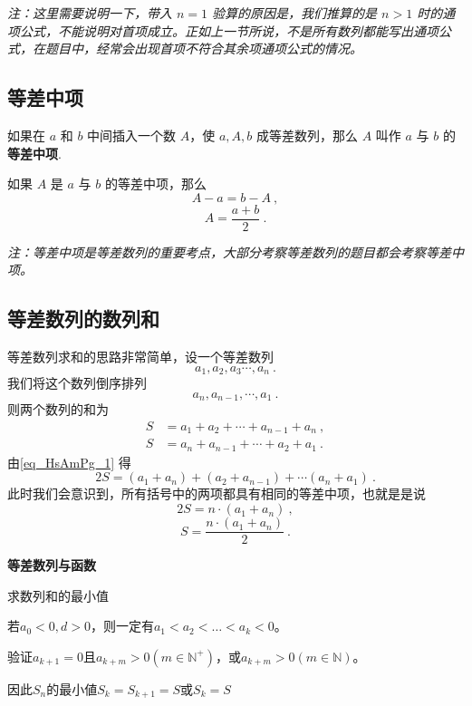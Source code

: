 \textsl{注：这里需要说明一下，带入 $n = 1$ 验算的原因是，我们推算的是 $n > 1$ 时的通项公式，不能说明对首项成立。正如上一节所说，不是所有数列都能写出通项公式，在题目中，经常会出现首项不符合其余项通项公式的情况。}

\subsection{等差中项}
如果在 $a$ 和 $b$ 中间插入一个数 $A$，使 $a,A,b$ 成等差数列，那么 $A$ 叫作 $a$ 与 $b$ 的\textbf{等差中项}.

如果 $A$ 是 $a$ 与 $b$ 的等差中项，那么
\begin{equation}
A - a = b - A~,
\end{equation}
\begin{equation}
A = \frac{a+b}{2}~.
\end{equation}

\textsl{注：等差中项是等差数列的重要考点，大部分考察等差数列的题目都会考察等差中项。}

\subsection{等差数列的数列和}

等差数列求和的思路非常简单，设一个等差数列
\begin{equation}
a_1,a_2,a_3\cdots,a_n~.
\end{equation}
我们将这个数列倒序排列
\begin{equation}
a_n,a_{n-1},\cdots,a_1~.
\end{equation}
则两个数列的和为
\begin{equation}\label{eq_HsAmPg_1}
\begin{aligned}
S &= a_1 + a_2 + \cdots + a_{n-1} + a_n ~,\\
S &= a_n + a_{n - 1} + \cdots + a_2 + a_1~.
\end{aligned}
\end{equation}
由\autoref{eq_HsAmPg_1} 得
\begin{equation}
2S = (a_1+a_n) + (a_2+a_{n-1}) +\cdots (a_n + a_1)~.
\end{equation}
此时我们会意识到，所有括号中的两项都具有相同的等差中项，也就是是说
\begin{equation}
2S = n \cdot (a_1+a_n)~,
\end{equation}
\begin{equation}
S = \frac{n\cdot(a_1+a_n)}{2}~.
\end{equation}

\textbf{等差数列与函数}

求数列和的最小值

若$a_0<0,d>0$，则一定有$a_1<a_2<\dots<a_{k}<0$。

验证$a_{k+1} =0$且$a_{k+m}>0(m\in\mathbb{N}^+)$，或$a_{k+m}>0(m\in\mathbb{N})$。

因此$S_n$的最小値$S_k=S_{k+1}=S$或$S_k=S$